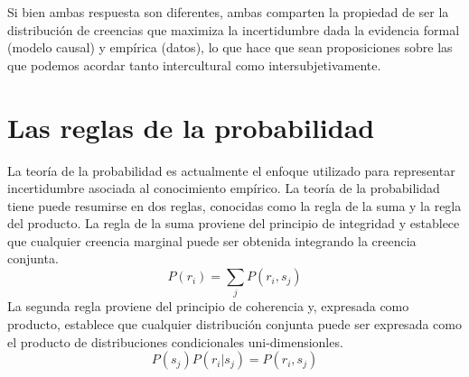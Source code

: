 \documentclass[a4paper,10pt]{book}
\theoremstyle{definition}
\begin{document}
%  
Si bien ambas respuesta son diferentes, ambas comparten la propiedad de ser la distribuci\'on de creencias que maximiza la incertidumbre dada la evidencia formal (modelo causal) y emp\'irica (datos), lo que hace que sean proposiciones sobre las que podemos acordar tanto intercultural como intersubjetivamente.


\section{Las reglas de la probabilidad}\label{sec:reglas_de_la_probabilidad}

La teor\'ia de la probabilidad es actualmente el enfoque utilizado para representar incertidumbre asociada al conocimiento emp\'irico.
%
La teor\'ia de la probabilidad tiene puede resumirse en dos reglas, conocidas como la regla de la suma y la regla del producto.
%
La regla de la suma proviene del principio de integridad y establece que cualquier creencia marginal puede ser obtenida integrando la creencia conjunta.
%
\begin{equation}
P(r_i) = \sum_j P(r_i, s_j)
\end{equation}
%
La segunda regla proviene del principio de coherencia y, expresada como producto, establece que cualquier distribuci\'on conjunta puede ser expresada como el producto de distribuciones condicionales uni-dimensionles.
%
\begin{equation}
P(s_j)P(r_i|s_j) = P(r_i, s_j)
\end{equation}

\end{document}
